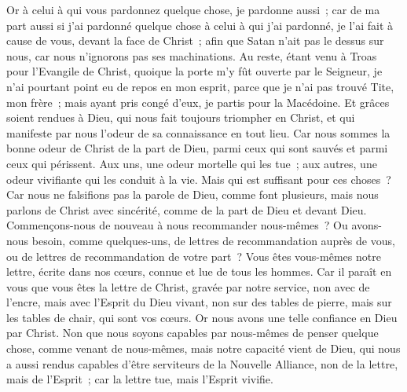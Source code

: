 \begin{multicols}{2}
Or à celui à qui vous pardonnez quelque chose, je pardonne aussi~; car de ma part aussi si j'ai pardonné quelque chose à celui à qui j'ai pardonné, je l'ai fait à cause de vous, devant la face de Christ~;
afin que Satan n'ait pas le dessus sur nous, car nous n'ignorons pas ses machinations.
Au reste, étant venu à Troas pour l'Evangile de Christ, quoique la porte m'y fût ouverte par le Seigneur, je n'ai pourtant point eu de repos en mon esprit, parce que je n'ai pas trouvé Tite, mon frère~;
mais ayant pris congé d'eux, je partis pour la Macédoine.
Et grâces soient rendues à Dieu, qui nous fait toujours triompher en Christ, et qui manifeste par nous l'odeur de sa connaissance en tout lieu.
Car nous sommes la bonne odeur de Christ de la part de Dieu, parmi ceux qui sont sauvés et parmi ceux qui périssent.
Aux uns, une odeur mortelle qui les tue~; aux autres, une odeur vivifiante qui les conduit à la vie. Mais qui est suffisant pour ces choses~?
Car nous ne falsifions pas la parole de Dieu, comme font plusieurs, mais nous parlons de Christ avec sincérité, comme de la part de Dieu et devant Dieu.
\VerseOne{}Commençons-nous de nouveau à nous recommander nous-mêmes~? Ou avons-nous besoin, comme quelques-uns, de lettres de recommandation auprès de vous, ou de lettres de recommandation de votre part~?
Vous êtes vous-mêmes notre lettre, écrite dans nos cœurs, connue et lue de tous les hommes.
Car il paraît en vous que vous êtes la lettre de Christ, gravée par notre service, non avec de l'encre, mais avec l'Esprit du Dieu vivant, non sur des tables de pierre, mais sur les tables de chair, qui sont vos cœurs.
Or nous avons une telle confiance en Dieu par Christ.
Non que nous soyons capables par nous-mêmes de penser quelque chose, comme venant de nous-mêmes, mais notre capacité vient de Dieu,
qui nous a aussi rendus capables d'être serviteurs de la Nouvelle Alliance, non de la lettre, mais de l'Esprit~; car la lettre tue, mais l'Esprit vivifie.

\end{multicols}
